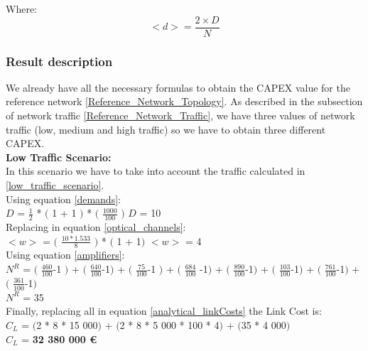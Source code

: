 Where:
\begin{equation}
<d> = \frac{2 \times D}{N}
\label{average_demand_protec}
\end{equation}


\subsubsection{Result description}

We already have all the necessary formulas to obtain the CAPEX value for the reference network \ref{Reference_Network_Topology}. As described in the subsection of network traffic \ref{Reference_Network_Traffic}, we have three values of network traffic (low, medium and high traffic) so we have to obtain three different CAPEX.\\

\textbf{Low Traffic Scenario:}\\
In this scenario we have to take into account the traffic calculated in \ref{low_traffic_scenario}.\\

Using equation \ref{demands}:\\

$D$ = $\frac{1}{2}$ * $($ 1 + 1 $)$ * $($ $\frac{1000}{100}$ $)$ \qquad \qquad $D$ = 10\\

Replacing in equation \ref{optical_channels}:\\

$<w>$ = $($ $\frac{10 * 1.533}{8}$ $)$ * $($ 1 + 1$)$ \qquad \qquad $<w>$ = 4\\

Using equation \ref{amplifiers}:\\

$N^R$ = $($ $\frac{460}{100}$-1 $)$ + $($ $\frac{640}{100}$-1$)$ + $($ $\frac{75}{100}$-1 $)$ + $($ $\frac{684}{100}$ -1$)$ + $($ $\frac{890}{100}$-1$)$ + $($ $\frac{103}{100}$-1$)$ + $($ $\frac{761}{100}$-1$)$ + $($ $\frac{361}{100}$-1$)$\\

$N^R$ = 35\\

Finally, replacing all in equation \ref{analytical_linkCosts} the Link Cost is:\\

$C_L$ = $($2 * 8 * 15 000$)$ + $($2 * 8 * 5 000 * 100 * 4$)$ + $($35 * 4 000$)$\\

$C_L$ = \textbf{32 380 000 \euro}\\

